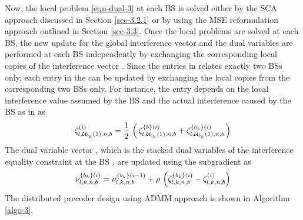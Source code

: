 Now, the local problem \eqref{eqn-dual-3} at each \ac{BS}  is solved either by the \ac{SCA} approach discussed in Section \ref{sec-3.2.1} or by using the \ac{MSE} reformulation approach outlined in Section \ref{sec-3.3}. Once the local problems are solved at each \ac{BS}, the new update for the global interference vector  and the dual variables  are performed at each \ac{BS} independently by exchanging the corresponding local copies of the interference vector . Since the entries in  relates exactly two \acp{BS} only, each entry in the  can be updated by exchanging the local copies from the corresponding two \acp{BS} only. For instance, the entry  depends on the local interference value  assumed by the \ac{BS}  and the actual interference caused by the \ac{BS}  as in  as
\begin{equation}
\zeta_{l,\mc{U}_{b_k}(1),n,b}^{(i)} = \frac{1}{2} \, \left ( \, \zeta^{\set{b}(i)}_{l,\mc{U}_{b_k}(1),n,b} + \zeta^{\set{b_k}(i)}_{l,\mc{U}_{b_k}(1),n,b} \, \right )
\label{zeta_update}
\end{equation}
The dual variable vector , which is the stacked dual variables of the interference equality constraint at the \ac{BS} , are updated using the subgradient as
\begin{equation}\label{dual-sg-update}
\nu^{\set{b_k}(i)}_{l,k,n,b} = \nu^{\set{b_k}(i-1)}_{l,k,n,b} + \rho \, \left (\zeta^{\set{b_k}(i)}_{l,k,n,b} - \zeta^{(i)}_{l,k,n,b} \right )
\end{equation}
The distributed precoder design using \ac{ADMM} approach is shown in Algorithm \ref{algo-3}.
